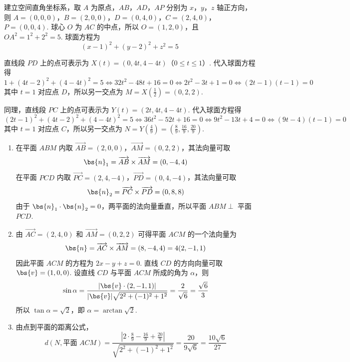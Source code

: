 \begin{solution}
建立空间直角坐标系，取 \(A\) 为原点，\(AB\)，\(AD\)，\(AP\) 分别为 \(x\)，\(y\)，\(z\) 轴正方向，则
\(A=(0,0,0)\)，\(B=(2,0,0)\)，\(D=(0,4,0)\)，\(C=(2,4,0)\)，\(P=(0,0,4)\).
球心 \(O\) 为 \(AC\) 的中点，所以 \(O=(1,2,0)\)，且
\(OA^{2}=1^{2}+2^{2}=5\). 球面方程为
\[
(x-1)^{2}+(y-2)^{2}+z^{2}=5
\]

直线段 \(PD\) 上的点可表示为 \(X(t)=(0,4t,4-4t)\)（\(0\leqslant t\leqslant1\)）. 代入球面方程得
\[
1+(4t-2)^{2}+(4-4t)^{2}=5
\Longleftrightarrow 32t^{2}-48t+16=0
\Longleftrightarrow 2t^{2}-3t+1=0
\Longleftrightarrow (2t-1)(t-1)=0
\]
其中 \(t=1\) 对应点 \(D\)，所以另一交点为 \(M=X\left(\frac12\right)=(0,2,2)\).

同理，直线段 \(PC\) 上的点可表示为 \(Y(t)=(2t,4t,4-4t)\). 代入球面方程得
\[
(2t-1)^{2}+(4t-2)^{2}+(4-4t)^{2}=5
\Longleftrightarrow 36t^{2}-52t+16=0
\Longleftrightarrow 9t^{2}-13t+4=0
\Longleftrightarrow (9t-4)(t-1)=0
\]
其中 \(t=1\) 对应点 \(C\)，所以另一交点为 \(N=Y\left(\frac49\right)=\left(\frac89,\frac{16}{9},\frac{20}{9}\right)\).

\begin{enumerate}
\item
在平面 \(ABM\) 内取
\(\overrightarrow{AB}=(2,0,0)\)，\(\overrightarrow{AM}=(0,2,2)\)，其法向量可取
\[
\bs{n}_{1}=\overrightarrow{AB}\times\overrightarrow{AM}=(0,-4,4)
\]
在平面 \(PCD\) 内取
\(\overrightarrow{PC}=(2,4,-4)\)，\(\overrightarrow{PD}=(0,4,-4)\)，其法向量可取
\[
\bs{n}_{2}=\overrightarrow{PC}\times\overrightarrow{PD}=(0,8,8)
\]
由于 \(\bs{n}_{1}\cdot\bs{n}_{2}=0\)，两平面的法向量垂直，所以平面 \(ABM\perp\) 平面 \(PCD\).

\item
由 \(\overrightarrow{AC}=(2,4,0)\) 和 \(\overrightarrow{AM}=(0,2,2)\)
可得平面 \(ACM\) 的一个法向量为
\[
\bs{n}=\overrightarrow{AC}\times\overrightarrow{AM}=(8,-4,4)=4(2,-1,1)
\]
因此平面 \(ACM\) 的方程为 \(2x-y+z=0\). 直线 \(CD\) 的方向向量可取 \(\bs{v}=(1,0,0)\). 设直线 \(CD\) 与平面 \(ACM\) 所成的角为 \(\alpha\)，则
\[
\sin\alpha=\frac{|\bs{v}\cdot(2,-1,1)|}{|\bs{v}|\sqrt{2^{2}+(-1)^{2}+1^{2}}}
=\frac{2}{\sqrt6}=\frac{\sqrt6}{3}
\]
所以 \(\tan\alpha=\sqrt2\)，即 \(\alpha=\arctan\sqrt2\).

\item
由点到平面的距离公式，
\[
d\left(N,\text{平面 }ACM\right)
=\frac{\left|2\cdot\frac89-\frac{16}{9}+\frac{20}{9}\right|}{\sqrt{2^{2}+(-1)^{2}+1^{2}}}
=\frac{20}{9\sqrt6}
=\frac{10\sqrt6}{27}
\]
\end{enumerate}
\end{solution}

